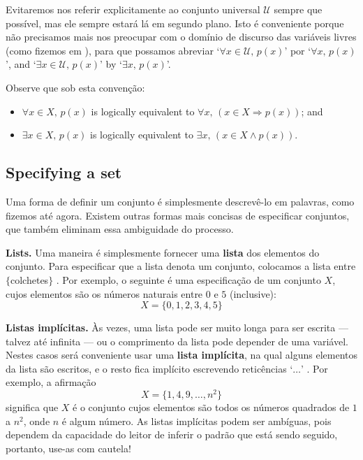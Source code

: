 Evitaremos nos referir explicitamente ao conjunto universal $\mathcal{U}$ sempre que possível, mas ele sempre estará lá em segundo plano. Isto é conveniente porque não precisamos mais nos preocupar com o domínio de discurso das variáveis ​​livres (como fizemos em ), para que possamos abreviar `$\forall x \in \mathcal{U},\, p(x)$' por `$\forall x,\, p(x)$', and `$\exists x \in \mathcal{U},\, p(x)$' by `$\exists x,\, p(x)$'.

Observe que sob esta convenção:
\begin{itemize}
\item $\forall x \in X,\, p(x)$ is logically equivalent to $\forall x,\, (x \in X \Rightarrow p(x))$; and
\item $\exists x \in X,\, p(x)$ is logically equivalent to $\exists x,\, (x \in X \wedge p(x))$.
\end{itemize}

\subsection*{Specifying a set}
Uma forma de definir um conjunto é simplesmente descrevê-lo em palavras, como fizemos até agora. Existem outras formas mais concisas de especificar conjuntos, que também eliminam essa ambiguidade do processo.

\textbf{Lists.}
Uma maneira é simplesmente fornecer uma \textbf{lista} dos elementos do conjunto. Para especificar que a lista denota um conjunto, colocamos a lista entre $\{$colchetes$\}$ \lindexmmc{\{\dots\textbackslash{}\}}{$\{\dots\}$}. Por exemplo, o seguinte é uma especificação de um conjunto $X$, cujos elementos são os números naturais entre $0$ e $5$ (inclusive):
\[ X = \{ 0, 1, 2, 3, 4, 5 \} \]

\textbf{Listas implícitas.}
Às vezes, uma lista pode ser muito longa para ser escrita — talvez até infinita — ou o comprimento da lista pode depender de uma variável. Nestes casos será conveniente usar uma \textbf{lista implícita}, na qual alguns elementos da lista são escritos, e o resto fica implícito escrevendo reticências `$\dots$' . Por exemplo, a afirmação
\[ X = \{ 1, 4, 9, \dots, n^2 \} \]
significa que $X$ é o conjunto cujos elementos são todos os números quadrados de $1$ a $n^2$, onde $n$ é algum número. As listas implícitas podem ser ambíguas, pois dependem da capacidade do leitor de inferir o padrão que está sendo seguido, portanto, use-as com cautela!

